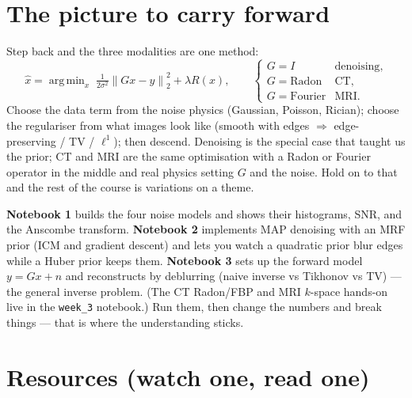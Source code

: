 \documentclass[11pt]{article}
\newcommand{\xhat}{\hat{x}}
\newcommand{\norm}[1]{\left\lVert #1 \right\rVert}
\DeclareMathOperator*{\argmin}{arg\,min}
\begin{document}
\section{The picture to carry forward}

Step back and the three modalities are one method:
\[
\xhat = \argmin_x\; \tfrac{1}{2\sigma^2}\norm{Gx-y}_2^2 + \lambda R(x),
\qquad
\begin{cases}
G=I & \text{denoising},\\
G=\text{Radon} & \text{CT},\\
G=\text{Fourier} & \text{MRI}.
\end{cases}
\]
Choose the data term from the noise physics (Gaussian, Poisson, Rician); choose
the regulariser from what images look like (smooth with edges $\Rightarrow$
edge-preserving / TV / $\ell^1$); then descend. Denoising is the special case
that taught us the prior; CT and MRI are the same optimisation with a Radon or
Fourier operator in the middle and real physics setting $G$ and the noise. Hold
on to that and the rest of the course is variations on a theme.

\begin{keybox}
\textbf{Notebook 1} builds the four noise models and shows their histograms,
SNR, and the Anscombe transform. \textbf{Notebook 2} implements MAP denoising
with an MRF prior (ICM and gradient descent) and lets you watch a quadratic
prior blur edges while a Huber prior keeps them. \textbf{Notebook 3} sets up the
forward model $y=Gx+n$ and reconstructs by deblurring (naive inverse vs Tikhonov
vs TV) --- the general inverse problem. (The CT Radon/FBP and MRI $k$-space
hands-on live in the \texttt{week\_3} notebook.) Run them, then change the
numbers and break things --- that is where the understanding sticks.
\end{keybox}

\section*{Resources (watch one, read one)}
\end{document}
